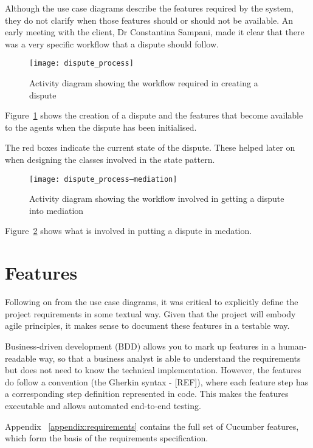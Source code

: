 Although the use case diagrams describe the features required by the system, they do not clarify when those features should or should not be available. An early meeting with the client, Dr Constantina Sampani, made it clear that there was a very specific workflow that a dispute should follow.

\begin{figure}[h!]
  \centering
    \ifimages
    \texttt{[image: dispute\_process]}
    \fi
  \caption{Activity diagram showing the workflow required in creating a dispute}
  \label{uml:activity:dispute}
\end{figure}

Figure~\ref{uml:activity:dispute} shows the creation of a dispute and the features that become available to the agents when the dispute has been initialised.

The red boxes indicate the current state of the dispute. These helped later on when designing the classes involved in the state pattern.

\begin{figure}[h!]
  \centering
    \ifimages
    \texttt{[image: dispute\_process--mediation]}
    \fi
  \caption{Activity diagram showing the workflow involved in getting a dispute into mediation}
  \label{uml:activity:mediation}
\end{figure}

Figure~\ref{uml:activity:mediation} shows what is involved in putting a dispute in medation.

\section{Features}

Following on from the use case diagrams, it was critical to explicitly define the project requirements in some textual way. Given that the project will embody agile principles, it makes sense to document these features in a testable way.

Business-driven development (BDD) allows you to mark up features in a human-readable way, so that a business analyst is able to understand the requirements but does not need to know the technical implementation. However, the features do follow a convention (the Gherkin syntax - [REF]), where each feature step has a corresponding step definition represented in code. This makes the features executable and allows automated end-to-end testing.

Appendix ~\ref{appendix:requirements} contains the full set of Cucumber features, which form the basis of the requirements specification.

